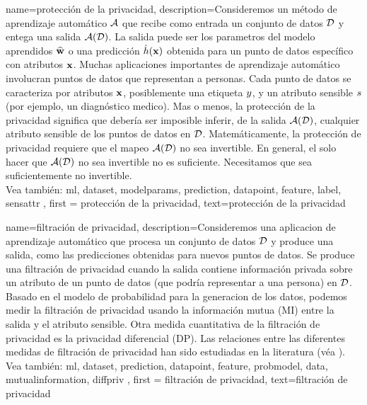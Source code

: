 {name=protección de la privacidad,
    description={Consideremos un método de aprendizaje automático $\mathcal{A}$ que recibe como entrada 
	 un conjunto de datos $\mathcal{D}$ y entega una salida $\mathcal{A}(\mathcal{D})$. La salida 
	 puede ser los parametros del modelo aprendidos $\widehat{{\bf w}}$ o una predicción
	 $\hat{h}({\bf x})$ obtenida para un punto de datos específico con atributos
	 ${\bf x}$. Muchas aplicaciones importantes de aprendizaje automático involucran puntos de datos 
		que representan a personas. Cada punto de datos se caracteriza por atributos ${\bf x}$, 
		posiblemente una etiqueta $y$, y un atributo sensible $s$ (por ejemplo, un diagnóstico medico). 
		Mas o menos, la protección de la privacidad significa que debería ser imposible inferir, de la salida $\mathcal{A}(\mathcal{D})$, 
		cualquier atributo sensible de los puntos de datos en $\mathcal{D}$. Matemáticamente, la protección de privacidad requiere que  
		el mapeo $\mathcal{A}(\mathcal{D})$ no sea invertible. En general, el solo hacer que  $\mathcal{A}(\mathcal{D})$ no sea invertible 
		no es suficiente. Necesitamos que sea suficientemente no invertible. 
		\\
		Vea también:  \gls{ml}, \gls{dataset}, \gls{modelparams}, \gls{prediction}, \gls{datapoint}, \gls{feature}, \gls{label}, \gls{sensattr} }, 
	first = {protección de la privacidad}, text={protección de la privacidad} 
}

{
	name=filtración de privacidad,
	description={Consideremos una aplicacion de aprendizaje automático que procesa un
	conjunto de datos $\mathcal{D}$ y produce una salida, como las predicciones
	obtenidas para nuevos puntos de datos. Se produce una filtración de privacidad 
	cuando la salida contiene información privada sobre un atributo de un 
	punto de datos (que podría representar a una persona) en $\mathcal{D}$. Basado en el modelo de probabilidad
	para la generacion de los datos, podemos medir la filtración de privacidad usando la información mutua (MI)
	entre la salida y el atributo sensible. Otra medida cuantitativa de la filtración de privacidad 
	es la privacidad diferencial (DP). Las relaciones entre las diferentes medidas de filtración de privacidad han sido estudiadas en la literatura (véa \cite{InfThDiffPriv}). 
	\\
		Vea también: \gls{ml}, \gls{dataset}, \gls{prediction}, \gls{datapoint},  \gls{feature}, \gls{probmodel}, \gls{data}, \gls{mutualinformation}, \gls{diffpriv} }, 
	first = {filtración de privacidad}, text={filtración de privacidad} 
}



